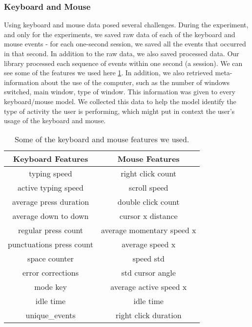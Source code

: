 \documentclass[../main.tex]{subfiles}
\begin{document}
    \subsubsection{Keyboard and Mouse}

    Using keyboard and mouse data posed several challenges. During the experiment, and only for the experiments, 
    we saved raw data of each of the keyboard and mouse events - for each one-second session, we saved all the events that occurred in that second. 
    In addition to the raw data, we also saved processed data. Our library processed each sequence of events within one second (a session). 
    We can see some of the features we used here \ref{table:keyboard_mouse_features}. In addition, we also retrieved meta-information about the use of the computer, 
    such as the number of windows switched, main window, type of window. This information was given to every keyboard/mouse model. 
    We collected this data to help the model identify the type of activity the user is performing, which might put in context the user's usage of 
    the keyboard and mouse.
 
    \begin{table}[htp]
        \centering
        \begin{tabular}{cc}
        \toprule
        Keyboard Features        & Mouse Features            \\ \midrule
        typing speed             & right click count         \\
        active typing speed      & scroll speed              \\
        average press duration   & double click count        \\
        average down to down     & cursor x distance         \\
        regular press count      & average momentary speed x \\
        punctuations press count & average speed x           \\
        space counter            & speed std                 \\
        error corrections        & std cursor angle          \\
        mode key                 & average active speed x    \\
        idle time                & idle time                 \\
        unique\_events           & right click duration      \\ \bottomrule
        \end{tabular}
        \caption{Some of the keyboard and mouse features we used.}
        \label{table:keyboard_mouse_features}
    \end{table}
\end{document}
